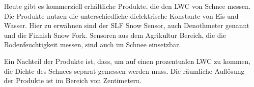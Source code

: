 

Heute gibt es kommerziell erhältliche Produkte, die den LWC von Schnee messen. Die Produkte nutzen die unterschiedliche dielektrische Konstante von Eis und Wasser. Hier zu erwähnen sind der SLF Snow Sensor, auch Denothmeter genannt und die Finnish Snow Fork. Sensoren aus dem Agrikultur Bereich, die die Bodenfeuchtigkeit messen, sind auch im Schnee einsetzbar.

Ein Nachteil der Produkte ist, dass, um auf einen prozentualen LWC zu kommen, die Dichte des Schnees separat gemessen werden muss. Die räumliche Auflösung der Produkte ist im Bereich von Zentimetern.
